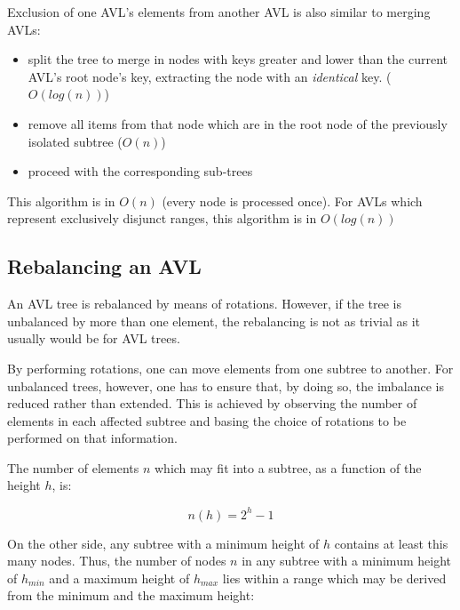         Exclusion of one AVL's elements from another AVL is also similar to
        merging AVLs:

        \begin{itemize}
            \item split the tree to merge in nodes with keys greater and lower
                than the current AVL's root node's key, extracting the node
                with an \emph{identical} key. ($O(log(n))$)
            \item remove all items from that node which are in the root node
                of the previously isolated subtree ($O(n)$)
            \item proceed with the corresponding sub-trees
        \end{itemize}

        This algorithm is in $O(n)$ (every node is processed once).
        For AVLs which represent exclusively disjunct ranges, this algorithm
        is in $O(log(n))$


    \subsection{Rebalancing an AVL}
    \label{sec:AVL_ops-rebalance}

        An AVL tree is rebalanced by means of rotations.
        However, if the tree is unbalanced by more than one element, the
        rebalancing is not as trivial as it usually would be for AVL trees.

        By performing rotations, one can move elements from one subtree to
        another.
        For unbalanced trees, however, one has to ensure that, by doing so, the
        imbalance is reduced rather than extended.
        This is achieved by observing the number of elements in each affected
        subtree and basing the choice of rotations to be performed on that
        information.

        The number of elements $n$ which may fit into a subtree, as a function
        of the height $h$, is:

        \begin{equation}
            n(h) = 2^h-1
            \label{eq:AVL_ops-max_nodes_in_subtree}
        \end{equation}

        On the other side, any subtree with a minimum height of $h$ contains at
        least this many nodes.
        Thus, the number of nodes $n$ in any subtree with a minimum height of
        $h_{min}$ and a maximum height of $h_{max}$ lies within a range which
        may be derived from the minimum and the maximum height:

